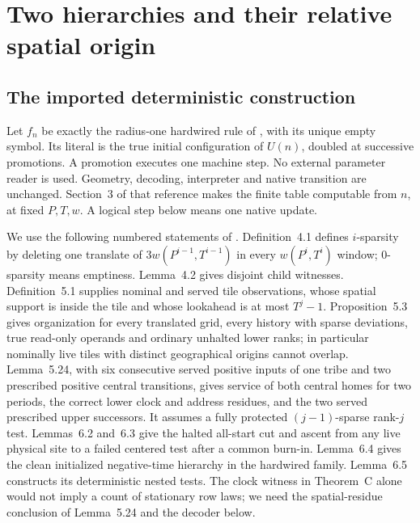 \section{Two hierarchies and their relative spatial origin}\label{sec:line-hierarchy}
\subsection{The imported deterministic construction}
Let $f_n$ be exactly the radius-one hardwired rule of
\cite[Theorem~C and Section~3.5]{DMline}, with its unique empty symbol.
Its literal is the true initial configuration of $U(n)$, doubled at
successive promotions. A promotion executes one machine step.
No external parameter reader is used. Geometry, decoding, interpreter
and native transition are unchanged. Section~3 of that reference
makes the finite table computable from $n$, at fixed $P,T,w$.
A logical step below means one native update.

We use the following numbered statements of \cite{DMline}.
Definition~4.1 defines $i$-sparsity by deleting one translate of
$3w(P^{i-1},T^{i-1})$ in every $w(P^i,T^i)$ window;
$0$-sparsity means emptiness. Lemma~4.2 gives disjoint child witnesses.
Definition~5.1 supplies nominal and served tile observations, whose
spatial support is inside the tile and whose lookahead is at most
$T^j-1$. Proposition~5.3 gives organization for every translated grid,
every history with sparse deviations, true read-only operands and
ordinary unhalted lower ranks; in particular nominally live tiles
with distinct geographical origins cannot overlap.
Lemma~5.24, with six consecutive served positive inputs of one tribe
and two prescribed positive central transitions, gives service of
both central homes for two periods, the correct lower clock and
address residues, and the two served prescribed upper successors.
It assumes a fully protected $(j-1)$-sparse rank-$j$ test.
Lemmas~6.2 and~6.3 give the halted all-start cut and ascent from any
live physical site to a failed centered test after a common burn-in.
Lemma~6.4 gives the clean initialized negative-time hierarchy in the
hardwired family. Lemma~6.5 constructs its deterministic nested tests.
The clock witness in Theorem~C alone would not imply a count of
stationary row laws; we need the spatial-residue conclusion of
Lemma~5.24 and the decoder below.

